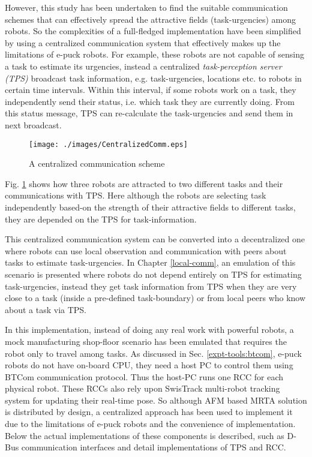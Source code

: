 However, this study has been undertaken to find the suitable communication schemes that can effectively spread the attractive fields (task-urgencies) among robots. So the complexities of a full-fledged implementation have been simplified by using a centralized communication system  that effectively makes up the limitations of e-puck robots.  For example, these robots are not  capable of sensing a task to estimate its urgencies, instead a centralized {\em task-perception server (TPS)} broadcast task information, e.g. task-urgencies, locations etc. to robots in certain time intervals. Within this interval, if some robots work on a task, they independently send their status, i.e. which task they are currently doing. From this status message,  TPS can re-calculate the task-urgencies and send them in next broadcast. 
\begin{figure}[H]
\centering
\texttt{[image: ./images/CentralizedComm.eps]}
\caption{\small A centralized communication scheme} %
\label{fig:ccm} %
\end{figure}

Fig. \ref{fig:ccm} shows how three robots are attracted to two different tasks and their communications with TPS. Here although the robots are selecting task independently based-on the strength of their attractive fields to different tasks, they are depended on the TPS for task-information.

This centralized communication system can be converted into a decentralized one where robots can use local observation and communication with peers about tasks to estimate task-urgencies. In Chapter \ref{local-comm}, an emulation of this scenario is presented where robots do not depend entirely on TPS for estimating task-urgencies, instead they get task information from TPS when they are very close to a task (inside a pre-defined task-boundary) or from local peers who know about a task via TPS.

In this implementation, instead of doing any real work with powerful robots,  a mock manufacturing shop-floor scenario has been emulated that requires the robot only to travel among tasks. As discussed in Sec. \ref{expt-tools:btcom}, e-puck robots do not have on-board CPU, they need a host PC to  control them using BTCom communication protocol. Thus the host-PC  runs one RCC for each physical robot. These RCCs also rely upon SwisTrack multi-robot tracking system for updating their real-time pose. So although AFM based MRTA solution is distributed by design,  a centralized approach has been used to implement it due to the limitations of e-puck robots and the convenience of implementation. Below the actual implementations of these components is described, such as D-Bus communication interfaces and detail implementations of TPS and RCC.
